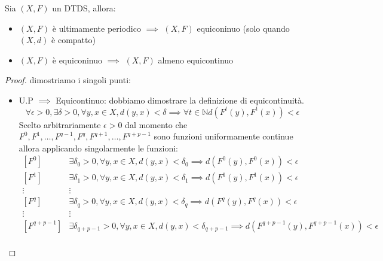 \begin{teorema}
    Sia $(X,F)$ un DTDS, allora:
    \begin{itemize}
        \item $(X,F)$ è ultimamente periodico $\implies$ $(X,F)$ equiconinuo (solo quando $(X,d)$ è compatto)
        \item $(X,F)$ è equiconinuo $\implies$ $(X,F)$ almeno equicontinuo
    \end{itemize}
    \begin{proof}
        dimostriamo i singoli punti:
        \begin{itemize}
            \item U.P $\implies$ Equicontinuo: dobbiamo dimostrare la definizione
                  di equicontinuità.
                  $$\forall \epsilon > 0,\exists \delta > 0, \forall y, x\in X, d(y,x) < \delta \implies \forall t\in \mathbb{N} d(F^t(y),F^t(x))< \epsilon$$
                  Scelto arbitrariamente $\epsilon>0$ dal momento che $F^0, F^{1}, \dots, F^{q-1},F^{q},F^{q+1},\dots,F^{q+p-1}$
                  sono funzioni uniformamente continue allora applicando singolarmente le funzioni:
                  \begin{equation*}
                      \begin{array}{cl}
                          \left[F^0\right]       & \exists \delta_0 > 0, \forall y, x\in X, d(y,x) < \delta_0 \implies d(F^0(y),F^0(x))< \epsilon                         \\
                          \left[F^1\right]       & \exists \delta_1 > 0, \forall y, x\in X, d(y,x) < \delta_1 \implies d(F^1(y),F^1(x))< \epsilon                         \\
                          \vdots                 & \vdots                                                                                                                         \\
                          \left[F^q\right]       & \exists \delta_q > 0, \forall y, x\in X, d(y,x) < \delta_q \implies d(F^q(y),F^q(x))< \epsilon                         \\
                          \vdots                 & \vdots                                                                                                                         \\
                          \left[F^{q+p-1}\right] & \exists \delta_{q+p-1} > 0, \forall y, x\in X, d(y,x) < \delta_{q+p-1} \implies d(F^{q+p-1}(y),F^{q+p-1}(x))< \epsilon \\

\end{array}
\end{equation*}
\end{itemize}
\end{proof}
\end{teorema}

